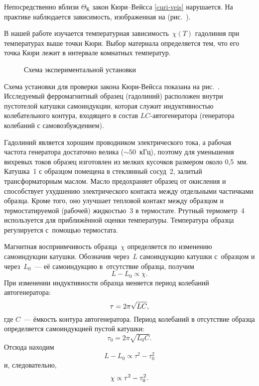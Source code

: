 
Непосредственно вблизи $\Theta_К$ закон Кюри--Вейсса
\eqref{curi-veis} нарушается. На практике наблюдается зависимость, изображенная
на (рис.~).

\experiment

В нашей работе изучается температурная зависимость~$\chi(T)$ гадолиния при
температурах выше точки Кюри. Выбор материала определяется тем, что его точка
Кюри лежит в интервале комнатных температур.

\begin{figure}[h]
    \caption{Схема экспериментальной установки}
\end{figure}


Схема установки для проверки закона Кюри-Вейсса показана на рис.~.
Исследуемый ферромагнитный образец (гадолиний) расположен внутри пустотелой
катушки самоиндукции, которая служит индуктивностью колебательного контура,
входящего в состав $LC$-авто\-генератора (генератора колебаний с
самовозбуждением).



Гадолиний является хорошим проводником электрического тока, а рабочая частота
генератора достаточно велика (${\sim}50$~кГц), поэтому для уменьшения вихревых
токов образец изготовлен из мелких кусочков размером около 0,5~мм.
Катушка~1 с образцом помещена в стеклянный сосуд~2, залитый трансформаторным
маслом. Масло предохраняет образец от окисления и способствует ухудшению
электрического контакта между отдельными частичками образца. Кроме того, оно
улучшает тепловой контакт между образцом и термостатируемой (рабочей)
жидкостью~3 в термостате. Ртутный термометр~4 используется для приближённой
оценки температуры. Температура образца регулируется с~помощью термостата.

Магнитная восприимчивость образца~$\chi$ определяется по изменению самоиндукции
катушки. Обозначив через~$L$ самоиндукцию катушки с~образцом и через~$L_0$~---
её самоиндукцию в~отсутствие образца, получим
\begin{equation*}%
	L-L_0\propto \chi.
\end{equation*}
При изменении индуктивности образца меняется период колебаний автогенератора:
\begin{equation*}%
	\tau=2\pi\sqrt{LC},
	\eqmark{4}
\end{equation*}
где $C$~--- ёмкость контура автогенератора.
Период колебаний в отсутствие образца определяется самоиндукцией пустой катушки:
\begin{equation*}
	\tau_0=2\pi\sqrt{L_0 C}.
\end{equation*}
Отсюда находим
\begin{equation*}
	L-L_0 \propto \tau^2-\tau_0^2
\end{equation*}
и, следовательно,
\begin{equation}%
	\eqmark{6}
	\chi\propto \tau^2-\tau_0^2.
\end{equation}

